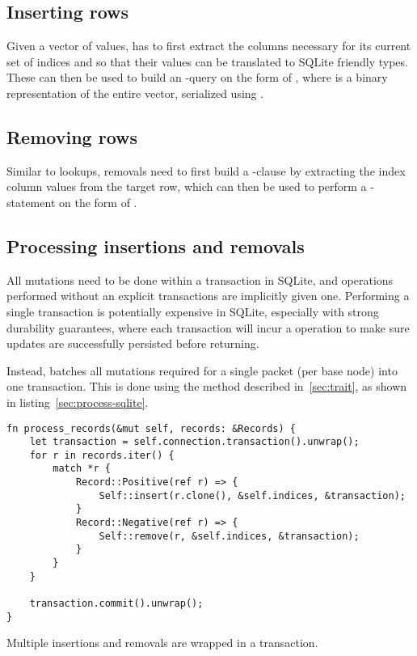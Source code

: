 \subsection{Inserting rows}

Given a vector of values,  has to first extract the
columns necessary for its current set of indices and so that their values can be
translated to SQLite friendly types. These can then be used to build an
-query on the form of , where  is a binary representation of the entire
vector, serialized using .

\subsection{Removing rows}

Similar to lookups, removals need to first build a -clause by
extracting the index column values from the target row, which can then be used
to perform a -statement on the form of .

\subsection{Processing insertions and removals}

All mutations need to be done within a transaction in SQLite, and operations
performed without an explicit transactions are implicitly given one. Performing
a single transaction is potentially expensive in SQLite, especially with strong
durability guarantees, where each transaction will incur a 
operation to make sure updates are successfully persisted before returning.

Instead,  batches all mutations required for a single
packet (per base node) into one transaction. This is done using the
 method described in~\ref{sec:trait}, as shown in
listing~\ref{sec:process-sqlite}.

\begin{listing}[H]
  \begin{verbatim}
fn process_records(&mut self, records: &Records) {
    let transaction = self.connection.transaction().unwrap();
    for r in records.iter() {
        match *r {
            Record::Positive(ref r) => {
                Self::insert(r.clone(), &self.indices, &transaction);
            }
            Record::Negative(ref r) => {
                Self::remove(r, &self.indices, &transaction);
            }
        }
    }

    transaction.commit().unwrap();
}
  \end{verbatim}

  \caption{Multiple insertions and removals are wrapped in a transaction.}\label{lst:process-sqlite}
\end{listing}


